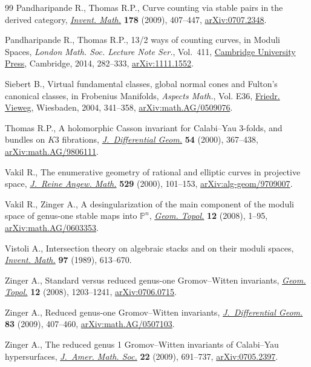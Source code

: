 \documentclass[pdftex]{sigma}
\numberwithin{equation}{section}
\begin{document}
\begin{thebibliography}{99}
Pandharipande R., Thomas R.P., Curve counting via stable pairs in the derived
 category, \href{https://doi.org/10.1007/s00222-009-0203-9}{\textit{Invent. Math.}} \textbf{178} (2009), 407--447,
 \href{https://arxiv.org/abs/0707.2348}{arXiv:0707.2348}.

Pandharipande R., Thomas R.P., 13/2 ways of counting curves, in Moduli Spaces,
 \textit{London Math. Soc. Lecture Note Ser.}, Vol.~411, \href{https://doi.org/10.1017/CBO9781107279544.007}{Cambridge University
 Press}, Cambridge, 2014, 282--333, \href{https://arxiv.org/abs/1111.1552}{arXiv:1111.1552}.

Siebert B., Virtual fundamental classes, global normal cones and {F}ulton's
 canonical classes, in Frobenius Manifolds, \textit{Aspects Math.}, Vol. E36,
 \href{https://doi.org/10.1007/978-3-322-80236-1_13}{Friedr. Vieweg}, Wiesbaden, 2004, 341--358, \href{https://arxiv.org/abs/math.AG/0509076}{arXiv:math.AG/0509076}.

Thomas R.P., A holomorphic {C}asson invariant for {C}alabi--{Y}au 3-folds, and
 bundles on {$K3$} fibrations, \href{https://doi.org/10.4310/jdg/1214341649}{\textit{J.~Differential Geom.}} \textbf{54}
 (2000), 367--438, \href{https://arxiv.org/abs/math.AG/9806111}{arXiv:math.AG/9806111}.

Vakil R., The enumerative geometry of rational and elliptic curves in
 projective space, \href{https://doi.org/10.1515/crll.2000.094}{\textit{J.~Reine Angew. Math.}} \textbf{529} (2000),
 101--153, \href{https://arxiv.org/abs/alg-geom/9709007}{arXiv:alg-geom/9709007}.

Vakil R., Zinger A., A desingularization of the main component of the moduli
 space of genus-one stable maps into {${\mathbb P}^n$}, \href{https://doi.org/10.2140/gt.2008.12.1}{\textit{Geom. Topol.}}
 \textbf{12} (2008), 1--95, \href{https://arxiv.org/abs/math.AG/0603353}{arXiv:math.AG/0603353}.

Vistoli A., Intersection theory on algebraic stacks and on their moduli spaces,
 \href{https://doi.org/10.1007/BF01388892}{\textit{Invent. Math.}} \textbf{97} (1989), 613--670.

Zinger A., Standard versus reduced genus-one {G}romov--{W}itten invariants,
 \href{https://doi.org/10.2140/gt.2008.12.1203}{\textit{Geom. Topol.}} \textbf{12} (2008), 1203--1241, \href{https://arxiv.org/abs/0706.0715}{arXiv:0706.0715}.

Zinger A., Reduced genus-one {G}romov--{W}itten invariants,
 \href{https://doi.org/10.4310/jdg/1261495337}{\textit{J.~Differential Geom.}} \textbf{83} (2009), 407--460, \href{https://arxiv.org/abs/math.AG/0507103}{arXiv:math.AG/0507103}.

Zinger A., The reduced genus 1 {G}romov--{W}itten invariants of {C}alabi--{Y}au
 hypersurfaces, \href{https://doi.org/10.1090/S0894-0347-08-00625-5}{\textit{J.~Amer. Math. Soc.}} \textbf{22} (2009), 691--737,
 \href{https://arxiv.org/abs/0705.2397}{arXiv:0705.2397}.


\end{thebibliography}\LastPageEnding
\end{document}
